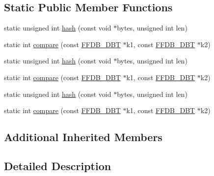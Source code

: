 \subsection*{Static Public Member Functions}
\begin{DoxyCompactItemize}
\item 
static unsigned int \mbox{\hyperlink{classADATIO_1_1SerialDBKey_a09904405d7dc203997431c6ca8af87ae}{hash}} (const void $\ast$bytes, unsigned int len)
\item 
static int \mbox{\hyperlink{classADATIO_1_1SerialDBKey_a5f73c31df1c824c61790ab7645fc030f}{compare}} (const \mbox{\hyperlink{adat-devel_2other__libs_2filedb_2filehash_2ffdb__db_8h_aa2e0984399491df0fdd20898ca8758f9}{F\+F\+D\+B\+\_\+\+D\+BT}} $\ast$k1, const \mbox{\hyperlink{adat-devel_2other__libs_2filedb_2filehash_2ffdb__db_8h_aa2e0984399491df0fdd20898ca8758f9}{F\+F\+D\+B\+\_\+\+D\+BT}} $\ast$k2)
\item 
static unsigned int \mbox{\hyperlink{classADATIO_1_1SerialDBKey_a09904405d7dc203997431c6ca8af87ae}{hash}} (const void $\ast$bytes, unsigned int len)
\item 
static int \mbox{\hyperlink{classADATIO_1_1SerialDBKey_a5f73c31df1c824c61790ab7645fc030f}{compare}} (const \mbox{\hyperlink{adat-devel_2other__libs_2filedb_2filehash_2ffdb__db_8h_aa2e0984399491df0fdd20898ca8758f9}{F\+F\+D\+B\+\_\+\+D\+BT}} $\ast$k1, const \mbox{\hyperlink{adat-devel_2other__libs_2filedb_2filehash_2ffdb__db_8h_aa2e0984399491df0fdd20898ca8758f9}{F\+F\+D\+B\+\_\+\+D\+BT}} $\ast$k2)
\item 
static unsigned int \mbox{\hyperlink{classADATIO_1_1SerialDBKey_a09904405d7dc203997431c6ca8af87ae}{hash}} (const void $\ast$bytes, unsigned int len)
\item 
static int \mbox{\hyperlink{classADATIO_1_1SerialDBKey_a5f73c31df1c824c61790ab7645fc030f}{compare}} (const \mbox{\hyperlink{adat-devel_2other__libs_2filedb_2filehash_2ffdb__db_8h_aa2e0984399491df0fdd20898ca8758f9}{F\+F\+D\+B\+\_\+\+D\+BT}} $\ast$k1, const \mbox{\hyperlink{adat-devel_2other__libs_2filedb_2filehash_2ffdb__db_8h_aa2e0984399491df0fdd20898ca8758f9}{F\+F\+D\+B\+\_\+\+D\+BT}} $\ast$k2)
\end{DoxyCompactItemize}
\subsection*{Additional Inherited Members}


\subsection{Detailed Description}
